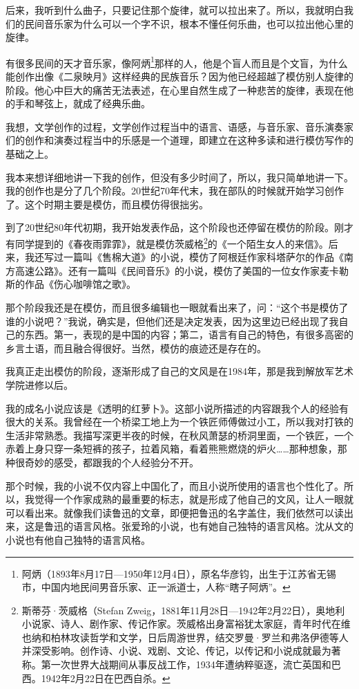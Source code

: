 \documentclass[12pt,a5paper]{ctexbook}
\begin{document}
后来，我听到什么曲子，只要记住那个旋律，就可以拉出来了。所以，我就明白我们的民间音乐家为什么可以一个字不识，根本不懂任何乐曲，也可以拉出他心里的旋律。

有很多民间的天才音乐家，像阿炳\footnote{阿炳（1893年8月17日—1950年12月4日），原名华彦钧，出生于江苏省无锡市，中国内地民间男音乐家、正一派道士，人称“瞎子阿炳”。}那样的人，他是个盲人而且是个文盲，为什么能创作出像《二泉映月》这样经典的民族音乐？因为他已经超越了模仿别人旋律的阶段。他心中巨大的痛苦无法表述，在心里自然生成了一种悲苦的旋律，表现在他的手和琴弦上，就成了经典乐曲。

我想，文学创作的过程，文学创作过程当中的语言、语感，与音乐家、音乐演奏家们的创作和演奏过程当中的乐感是一个道理，即建立在这种多读和进行模仿写作的基础之上。

我本来想详细地讲一下我的创作，但没有多少时间了，所以，我只简单地讲一下。我的创作也是分了几个阶段。20世纪70年代末，我在部队的时候就开始学习创作了。这个时期主要是模仿，而且模仿得很拙劣。

到了20世纪80年代初期，我开始发表作品，这个阶段也还停留在模仿的阶段。刚才有同学提到的《春夜雨霏霏》，就是模仿茨威格\footnote{斯蒂芬·茨威格（Stefan Zweig，1881年11月28日—1942年2月22日），奥地利小说家、诗人、剧作家、传记作家。茨威格出身富裕犹太家庭，青年时代在维也纳和柏林攻读哲学和文学，日后周游世界，结交罗曼·罗兰和弗洛伊德等人并深受影响。创作诗、小说、戏剧、文论、传记，以传记和小说成就最为著称。第一次世界大战期间从事反战工作，1934年遭纳粹驱逐，流亡英国和巴西。1942年2月22日在巴西自杀。}的《一个陌生女人的来信》。后来，我还写过一篇叫《售棉大道》的小说，模仿了阿根廷作家科塔萨尔的作品《南方高速公路》。还有一篇叫《民间音乐》的小说，模仿了美国的一位女作家麦卡勒斯的作品《伤心咖啡馆之歌》。

那个阶段我还是在模仿，而且很多编辑也一眼就看出来了，问：“这个书是模仿了谁的小说吧？”我说，确实是，但他们还是决定发表，因为这里边已经出现了我自己的东西。第一，表现的是中国的内容；第二，语言有自己的特色，有很多高密的乡言土语，而且融合得很好。当然，模仿的痕迹还是存在的。

我真正走出模仿的阶段，逐渐形成了自己的文风是在1984年，那是我到解放军艺术学院进修以后。

我的成名小说应该是《透明的红萝卜》。这部小说所描述的内容跟我个人的经验有很大的关系。我曾经在一个桥梁工地上为一个铁匠师傅做过小工，所以我对打铁的生活非常熟悉。我描写深更半夜的时候，在秋风萧瑟的桥洞里面，一个铁匠，一个赤着上身只穿一条短裤的孩子，拉着风箱，看着熊熊燃烧的炉火……那种想象，那种很奇妙的感受，都跟我的个人经验分不开。


那个时候，我的小说不仅内容上中国化了，而且小说所使用的语言也个性化了。所以，我觉得一个作家成熟的最重要的标志，就是形成了他自己的文风，让人一眼就可以看出来。就像我们读鲁迅的文章，即便把鲁迅的名字盖住，我们依然可以读出来，这是鲁迅的语言风格。张爱玲的小说，也有她自己独特的语言风格。沈从文的小说也有他自己独特的语言风格。
\end{document}
